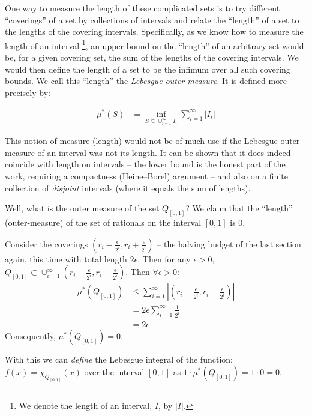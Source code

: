 \documentclass{article}
\begin{document}
One way to measure the length of these complicated sets is to try different ``coverings'' 
of a set by collections of intervals and relate the ``length'' of a set to the lengths of
the covering intervals. Specifically, as
we know how to measure the length of an interval%
\footnote{We denote the length of an interval, $I$, by $|I|$.}, an upper bound on 
the ``length'' of an arbitrary set would be, for a given covering set, 
the sum of the lengths of the covering intervals.
We would then define the length of a set to be the infimum over all such covering bounds.
We call this ``length'' the {\em Lebesgue outer measure\/}. It is defined more precisely by:

\begin{align*}
	\mu^*(S) &= \inf_{S \subseteq \mathop{\cup}_{i=1}^\infty I_i} \sum_{i=1}^\infty |I_i|
\end{align*}

This notion of measure (length) would not be of much use if the Lebesgue outer measure of
an interval was not its length.
It can be shown that it does indeed coincide with length on
intervals -- the lower bound is the honest part of the work, requiring a
compactness (Heine--Borel) argument -- and also on a finite collection of
{\em disjoint\/} intervals (where it equals the sum of lengths).

Well, what is the outer measure of the set $Q_{[0,1]}$? We claim that the ``length'' 
(outer-measure) of the set of rationals on the interval $[0,1]$ is $0$.

Consider the coverings $\left(r_i - \frac{\epsilon}{2^i}, r_i + \frac{\epsilon}{2^i}\right)$
-- the halving budget of the last section again, this time with total
length $2\epsilon$.
Then for any
$\epsilon > 0$, $Q_{[0,1]} \subset \mathop{\cup}_{i=1}^\infty \left(r_i - \frac{\epsilon}{2^i}, r_i + \frac{\epsilon}{2^i}\right)$.
Then $\forall \epsilon > 0$:
\begin{align*}
\mu^*(Q_{[0,1]}) &\le \sum_{i=1}^\infty  \left|\left(r_i - \frac{\epsilon}{2^i}, r_i + \frac{\epsilon}{2^i}\right)\right| \\
		 &= 2 \epsilon \sum_{i=1}^\infty \frac{1}{2^i} \\
		 &= 2 \epsilon
\end{align*}
Consequently, $\mu^*(Q_{[0,1]}) = 0$.

With this we can {\em define\/} the Lebesgue integral of the function:
$f(x) = \chi_{Q_{[0,1]}}(x)$ over the interval $[0,1]$
as $1 \cdot \mu^*(Q_{[0,1]}) = 1 \cdot 0 = 0$.
\end{document}
